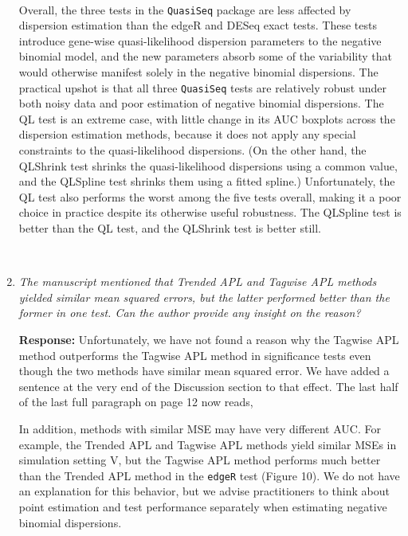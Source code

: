 \documentclass{article}
\providecommand{\q}{$\quad$ \newline}
\begin{document}
\begin{flushleft}
\begin{enumerate}
{\color{blue}\paragraph{} \indent Overall, the three tests in the {\tt QuasiSeq} package are less affected by dispersion estimation than the edgeR and DESeq exact tests. These tests introduce gene-wise quasi-likelihood dispersion parameters to the negative binomial model, and the new parameters absorb some of the variability that would otherwise manifest solely in the negative binomial dispersions. The practical upshot is that all three {\tt QuasiSeq} tests are relatively robust under both noisy data and poor estimation of negative binomial dispersions. The QL test is an extreme case, with little change in its AUC boxplots across the dispersion estimation methods, because it does not apply any special constraints to the quasi-likelihood dispersions. (On the other hand, the QLShrink test shrinks the quasi-likelihood dispersions using a common value, and the QLSpline test shrinks them using a fitted spline.) Unfortunately, the QL test also performs the worst among the five tests overall, making it a poor choice in practice despite its otherwise useful robustness. The QLSpline test is better than the QL test, and the QLShrink test is better still.} \q



\item \emph{The manuscript mentioned that Trended APL and Tagwise APL methods yielded similar mean squared errors, but the latter performed better than the former in one test. Can the author provide any insight on the reason?} \q

{\bf Response:} Unfortunately, we have not found a reason why the Tagwise APL method outperforms the Tagwise APL method in significance tests even though the two methods have similar mean squared error. We have added a sentence at the very end of the Discussion section to that effect. The last half of the last full paragraph on page 12 now reads, \q

{\color{blue} In addition, methods with similar MSE may have very different AUC. %
 For example, the Trended APL and Tagwise APL methods yield similar MSEs in simulation setting V, but the Tagwise APL method performs much better than the Trended APL method in the {\tt edgeR} test (Figure 10). We do not have an explanation for this behavior, but we advise practitioners to think about point estimation and test performance separately when estimating negative binomial dispersions.}



\end{enumerate}
\end{flushleft}
\end{document}

